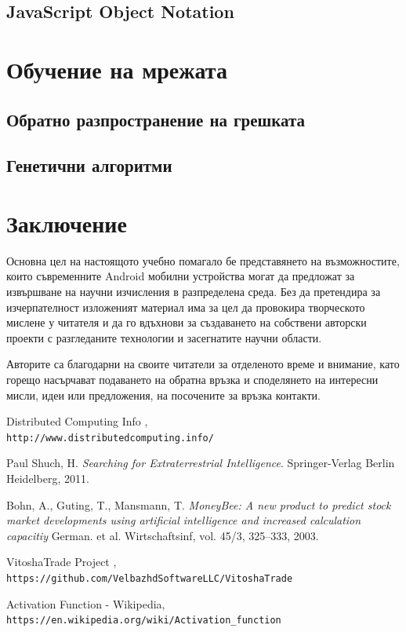 \documentclass[book,14pt,oneside,openany]{memoir}
\begin{document}
\section{JavaScript Object Notation}

\newpage
\chapter{Обучение на мрежата}
\label{chapter07}

\section{Обратно разпространение на грешката}

\section{Генетични алгоритми}

\newpage
{}
\chapter*{Заключение}

Основна цел на настоящото учебно помагало бе представянето на възможностите, които съвременните Android мобилни устройства могат да предложат за извършване на научни изчисления в разпределена среда. Без да претендира за изчерпателност изложеният материал има за цел да провокира творческото мислене у читателя и да го вдъхнови за създаването на собствени авторски проекти с разгледаните технологии и засегнатите научни области.  

Авторите са благодарни на своите читатели за отделеното време и внимание, като горещо насърчават подаването на обратна връзка и споделянето на интересни мисли, идеи или предложения, на посочените за връзка контакти.

\newpage
\begin{thebibliography}{99}

 Distributed Computing Info , \\\texttt{http://www.distributedcomputing.info/}

 Paul Shuch, H. \textit{Searching for Extraterrestrial Intelligence}. Springer-Verlag Berlin Heidelberg, 2011.

 Bohn, A., Guting, T., Mansmann, T. \textit{MoneyBee: A new product to predict stock market developments using artificial intelligence and increased calculation capacitiy} German. et al. Wirtschaftsinf, vol. 45/3, 325--333, 2003.

 VitoshaTrade Project , \\\texttt{https://github.com/VelbazhdSoftwareLLC/VitoshaTrade}

 Activation Function - Wikipedia, \\\texttt{https://en.wikipedia.org/wiki/Activation\_function}

\end{thebibliography}

\newpage
\listoffigures


\newpage
\printindex
\end{document}

